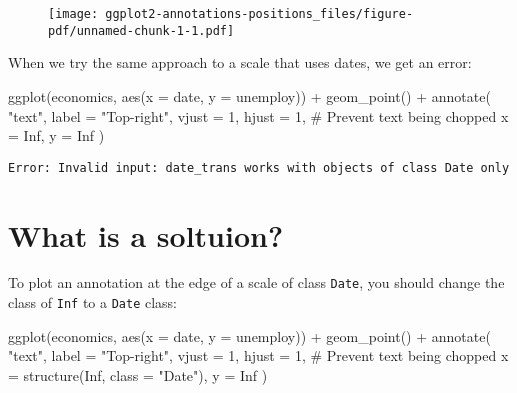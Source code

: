 \documentclass[
  letterpaper,
  DIV=11,
  numbers=noendperiod]{scrreprt}
\newenvironment{Shaded}{\begin{snugshade}}{\end{snugshade}}
\newcommand{\AttributeTok}[1]{\textcolor[rgb]{0.40,0.45,0.13}{#1}}
\newcommand{\CommentTok}[1]{\textcolor[rgb]{0.37,0.37,0.37}{#1}}
\newcommand{\ConstantTok}[1]{\textcolor[rgb]{0.56,0.35,0.01}{#1}}
\newcommand{\DecValTok}[1]{\textcolor[rgb]{0.68,0.00,0.00}{#1}}
\newcommand{\FunctionTok}[1]{\textcolor[rgb]{0.28,0.35,0.67}{#1}}
\newcommand{\NormalTok}[1]{\textcolor[rgb]{0.00,0.23,0.31}{#1}}
\newcommand{\SpecialCharTok}[1]{\textcolor[rgb]{0.37,0.37,0.37}{#1}}
\newcommand{\StringTok}[1]{\textcolor[rgb]{0.13,0.47,0.30}{#1}}
\begin{document}
\begin{figure}[H]

{\centering \texttt{[image: ggplot2-annotations-positions\_files/figure-pdf/unnamed-chunk-1-1.pdf]}

}

\end{figure}

When we try the same approach to a scale that uses dates, we get an
error:

\begin{Shaded}
\begin{Highlighting}[]
\FunctionTok{ggplot}\NormalTok{(economics, }\FunctionTok{aes}\NormalTok{(}\AttributeTok{x =}\NormalTok{ date, }\AttributeTok{y =}\NormalTok{ unemploy)) }\SpecialCharTok{+}
  \FunctionTok{geom\_point}\NormalTok{() }\SpecialCharTok{+}
  \FunctionTok{annotate}\NormalTok{(}
    \StringTok{"text"}\NormalTok{,}
    \AttributeTok{label =} \StringTok{"Top{-}right"}\NormalTok{,}
    \AttributeTok{vjust =} \DecValTok{1}\NormalTok{, }\AttributeTok{hjust =} \DecValTok{1}\NormalTok{, }\CommentTok{\# Prevent text being chopped}
    \AttributeTok{x =} \ConstantTok{Inf}\NormalTok{, }\AttributeTok{y =} \ConstantTok{Inf}
\NormalTok{  )}
\end{Highlighting}
\end{Shaded}

\begin{verbatim}
Error: Invalid input: date_trans works with objects of class Date only
\end{verbatim}

\hypertarget{what-is-a-soltuion}{%
\section{What is a soltuion?}\label{what-is-a-soltuion}}

To plot an annotation at the edge of a scale of class \texttt{Date}, you
should change the class of \texttt{Inf} to a \texttt{Date} class:

\begin{Shaded}
\begin{Highlighting}[]
\FunctionTok{ggplot}\NormalTok{(economics, }\FunctionTok{aes}\NormalTok{(}\AttributeTok{x =}\NormalTok{ date, }\AttributeTok{y =}\NormalTok{ unemploy)) }\SpecialCharTok{+}
  \FunctionTok{geom\_point}\NormalTok{() }\SpecialCharTok{+}
  \FunctionTok{annotate}\NormalTok{(}
    \StringTok{"text"}\NormalTok{,}
    \AttributeTok{label =} \StringTok{"Top{-}right"}\NormalTok{,}
    \AttributeTok{vjust =} \DecValTok{1}\NormalTok{, }\AttributeTok{hjust =} \DecValTok{1}\NormalTok{, }\CommentTok{\# Prevent text being chopped}
    \AttributeTok{x =} \FunctionTok{structure}\NormalTok{(}\ConstantTok{Inf}\NormalTok{, }\AttributeTok{class =} \StringTok{"Date"}\NormalTok{), }\AttributeTok{y =} \ConstantTok{Inf}
\NormalTok{  )}
\end{Highlighting}
\end{Shaded}
\end{document}
